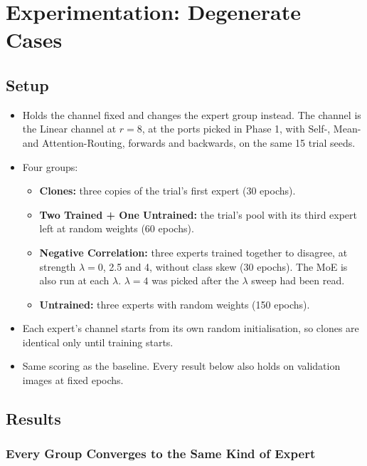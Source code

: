 \documentclass[11pt,a4paper]{article}
\newcommand{\finding}[2][12]{\Needspace{#1\baselineskip}\subsubsection*{#2}}
\begin{document}
\section{Experimentation: Degenerate Cases}

\subsection{Setup}

\begin{itemize}
  \item Holds the channel fixed and changes the expert group instead. The channel is the Linear
        channel at $r = 8$, at the ports picked in Phase 1, with Self-, Mean- and
        Attention-Routing, forwards and backwards, on the same 15 trial seeds.
  \item Four groups:
    \begin{itemize}
      \item \textbf{Clones:} three copies of the trial's first expert (30 epochs).
      \item \textbf{Two Trained + One Untrained:} the trial's pool with its third expert left at
            random weights (60 epochs).
      \item \textbf{Negative Correlation:} three experts trained together to disagree, at strength
            $\lambda = 0$, 2.5 and 4, without class skew (30 epochs). The MoE is also run at each
            $\lambda$. $\lambda = 4$ was picked after the $\lambda$ sweep had been read.
      \item \textbf{Untrained:} three experts with random weights (150 epochs).
    \end{itemize}
  \item Each expert's channel starts from its own random initialisation, so clones are identical
        only until training starts.
  \item Same scoring as the baseline. Every result below also holds on validation images at fixed
        epochs.
\end{itemize}

\subsection{Results}

\finding[24]{Every Group Converges to the Same Kind of Expert}
\end{document}
